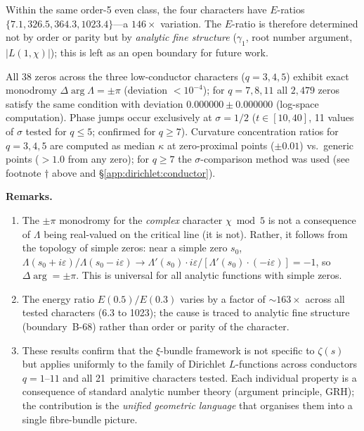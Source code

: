 \documentclass[11pt, a4paper]{article}
\theoremstyle{definition}
\theoremstyle{plain}
\begin{document}
\noindent
Within the same order-5 even class, the four characters have
$E$-ratios $\{7.1, 326.5, 364.3, 1023.4\}$---a $146\times$ variation.
The $E$-ratio is therefore determined not by order or parity but by
\emph{analytic fine structure} ($\gamma_1$, root number argument,
$|L(1,\chi)|$); this is left as an open boundary for future work.

\noindent
All 38 zeros across the three low-conductor characters ($q=3,4,5$) exhibit
exact monodromy $\Delta\arg\Lambda = \pm\pi$ (deviation $< 10^{-4}$);
for $q=7,8,11$ all $2{,}479$ zeros satisfy the same condition
with deviation $0.000000\pm 0.000000$ (log-space computation).
Phase jumps occur exclusively at $\sigma = 1/2$ ($t\in[10,40]$,
11 values of $\sigma$ tested for $q\leq 5$; confirmed for $q\geq 7$).
Curvature concentration ratios for $q=3,4,5$ are computed as median $\kappa$
at zero-proximal points ($\pm 0.01$) vs.\ generic points
($>1.0$ from any zero); for $q\geq 7$ the $\sigma$-comparison method
was used (see footnote $\dagger$ above and \S\ref{app:dirichlet:conductor}).

\medskip\noindent\textbf{Remarks.}
\begin{enumerate}
\item The $\pm\pi$ monodromy for the \emph{complex} character
  $\chi\bmod 5$ is not a consequence of $\Lambda$ being
  real-valued on the critical line (it is not).
  Rather, it follows from the topology of simple zeros:
  near a simple zero $s_0$,
  $\Lambda(s_0+i\varepsilon)/\Lambda(s_0-i\varepsilon)
  \to \Lambda'(s_0)\cdot i\varepsilon / [\Lambda'(s_0)\cdot(-i\varepsilon)]
  = -1$, so $\Delta\arg = \pm\pi$.
  This is universal for all analytic functions with simple zeros.
\item The energy ratio $E(0.5)/E(0.3)$ varies by a factor of
  $\sim 163\times$ across all tested characters (6.3 to 1023);
  the cause is traced to analytic fine structure (boundary~B-68)
  rather than order or parity of the character.
\item These results confirm that the $\xi$-bundle framework
  is not specific to $\zeta(s)$ but applies uniformly to the
  family of Dirichlet $L$-functions across conductors $q = 1$--$11$
  and all 21~primitive characters tested.
  Each individual property is a consequence of standard analytic
  number theory (argument principle, GRH); the contribution is
  the \emph{unified geometric language} that organises them
  into a single fibre-bundle picture.
\end{enumerate}
\end{document}
